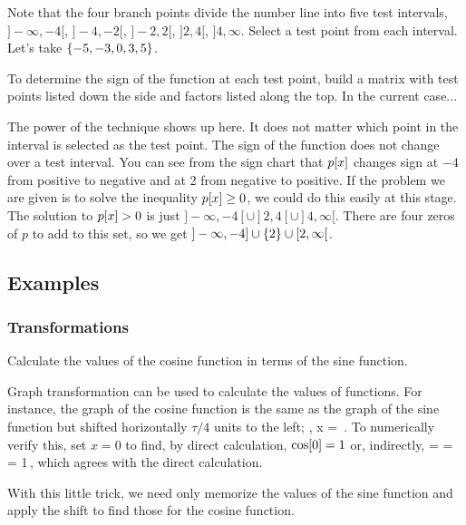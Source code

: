 Note that the four branch points divide the number line into five test intervals, $]-\infty, -4[$, $]-4,-2[$, $]-2,2[$, $]2,4[$, $]4,\infty$. Select a test point from each interval. Let's take $\left\lbrace{-5,-3,0,3,5}\right\rbrace$.

To determine the sign of the function at each test point, build a matrix with test points listed down the side and factors listed along the top. In the current case...

The power of the technique shows up here. It does not matter which point in the interval is selected as the test point. The sign of the function does not change over a test interval. You can see from the sign chart that $p\!\left[{x}\right]$ changes sign at $-4$ from positive to negative and at 2 from negative to positive. If the problem we are given is to solve the inequality $p\!\left[{x}\right] \geq 0$, we could do this easily at this stage. The solution to $p\!\left[{x}\right] > 0$ is just $]-\infty, -4[ \cup ]2,4[ \cup ]4,\infty[$. There are four zeros of $p$ to add to this set, so we get $]-\infty, -4]\cup \left\lbrace{2}\right\rbrace\cup [2,\infty[$.


\subsection{Examples}

\subsubsection{Transformations}
Calculate the values of the cosine function in terms of the sine function.

\begin{solution}
Graph transformation can be used to calculate the values of functions. For instance, the graph of the cosine function is the same as the graph of the sine function but shifted horizontally $\tau/4$ units to the left; \ie,
\beq
\cos\vat x = \sin{}\,.
\eeq
To numerically verify this, set $x = 0$ to find, by direct calculation, $\cos\!\left[{0}\right] = 1$ or, indirectly, 
\beq
\cos{} = \sin{} = \sin{} = 1\,,
\eeq
which agrees with the direct calculation.
\end{solution}

With this little trick, we need only memorize the values of the sine function and apply the shift to find those for the cosine function.
